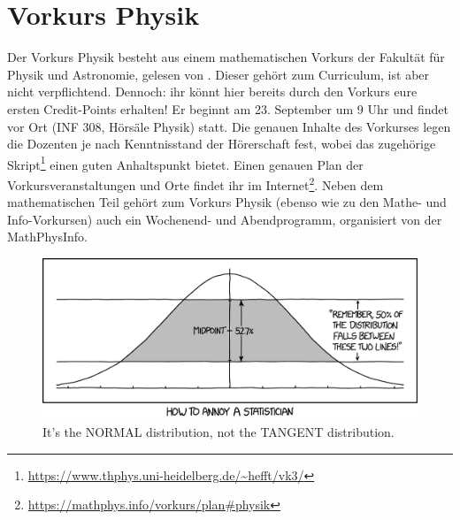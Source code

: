 \section{Vorkurs Physik}
Der Vorkurs Physik besteht aus einem mathematischen Vorkurs der Fakultät für Physik und Astronomie, gelesen von \dozentvorkurs. Dieser gehört zum Curriculum, ist aber nicht verpflichtend. Dennoch: ihr könnt hier bereits durch den Vorkurs eure ersten Credit-Points erhalten! Er beginnt am 23. September um 9 Uhr und findet vor Ort (INF 308, Hörsäle Physik) statt. Die genauen Inhalte des Vorkurses legen die Dozenten je nach Kenntnisstand der Hörerschaft fest, wobei das zugehörige Skript\footnote{\url{https://www.thphys.uni-heidelberg.de/~hefft/vk3/}} einen guten Anhaltspunkt bietet. Einen genauen Plan der Vorkursveranstaltungen und Orte findet ihr im Internet\footnote{\label{physik-vorkursplan}\url{https://mathphys.info/vorkurs/plan\#physik}}. Neben dem mathematischen Teil gehört zum Vorkurs Physik (ebenso wie zu den Mathe- und Info-Vorkursen) auch ein Wochenend- und Abendprogramm, organisiert von der MathPhysInfo.


\begin{figure}[!b]
    \centering
    \includegraphics[width=\textwidth]{bilder/normal_distribution_2x.png}
    \caption*{It's the NORMAL distribution, not the TANGENT distribution.}
\end{figure}

